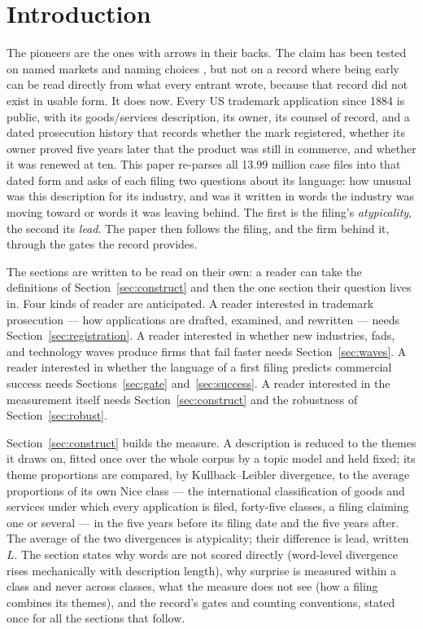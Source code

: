 \section{Introduction}\label{sec:intro}

The pioneers are the ones with arrows in their backs. The claim has been
tested on named markets and naming choices
\citep{GolderTellis1993, SemadeniAnderson2010}, but not on a record where
being early can be read directly from what every entrant wrote, because
that record did not exist in usable form. It does now. Every US trademark
application since 1884 is public, with its goods/services description, its
owner, its counsel of record, and a dated prosecution history that records
whether the mark registered, whether its owner proved five years later
that the product was still in commerce, and whether it was renewed at ten.
This paper re-parses all 13.99 million case files into that dated form and
asks of each filing two questions about its language: how unusual was this
description for its industry, and was it written in words the industry was
moving toward or words it was leaving behind. The first is the filing's
\emph{atypicality}, the second its \emph{lead}. The paper then follows the
filing, and the firm behind it, through the gates the record provides.

The sections are written to be read on their own: a reader can take the
definitions of Section~\ref{sec:construct} and then the one section their
question lives in. Four kinds of reader are anticipated. A reader
interested in trademark prosecution --- how applications are drafted,
examined, and rewritten --- needs Section~\ref{sec:registration}. A reader
interested in whether new industries, fads, and technology waves produce
firms that fail faster needs Section~\ref{sec:waves}. A reader interested
in whether the language of a first filing predicts commercial success
needs Sections~\ref{sec:gate} and~\ref{sec:success}. A reader interested
in the measurement itself needs Section~\ref{sec:construct} and the
robustness of Section~\ref{sec:robust}.

Section~\ref{sec:construct} builds the measure. A description is reduced
to the themes it draws on, fitted once over the whole corpus by a topic
model and held fixed; its theme proportions are compared, by
Kullback--Leibler divergence, to the average proportions of its own Nice
class --- the international classification of goods and services under
which every application is filed, forty-five classes, a filing claiming
one or several --- in the five years before its filing date and the five
years after. The average of the two divergences is atypicality; their
difference is lead, written $L$. The section states why words are not
scored directly (word-level divergence rises mechanically with description
length), why surprise is measured within a class and never across classes,
what the measure does not see (how a filing combines its themes), and the
record's gates and counting conventions, stated once for all the sections
that follow.

